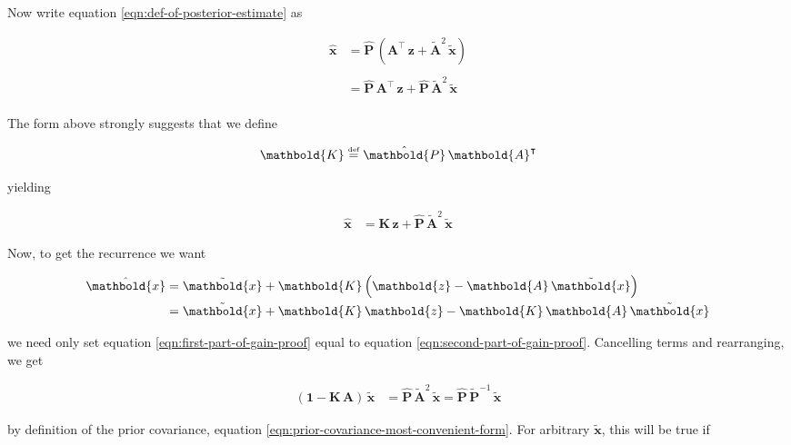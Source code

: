 \documentclass[10pt,oneside,x11names]{article}
\begin{document}
\noindent Now write 
equation
\ref{eqn:def-of-posterior-estimate}
as

\begin{align*}
\hat{\mathbold{x}}
&=
\hat{\mathbold{P}}\,
\left(
\mathbold{A}^\intercal\,
\mathbold{z} + 
{\tilde{\mathbold{A}}}^2\,
{\tilde{\mathbold{x}}}
\right)
\\
\\
&=
\hat{\mathbold{P}}\,\mathbold{A}^\intercal\,
\mathbold{z}
+
\hat{\mathbold{P}}\,
\tilde{\mathbold{A}}^2\,\tilde{\mathbold{x}}
\\
\end{align*}


The form above strongly suggests that we define

\begin{equation}
\label{eqn:kalman-gain-new-definition}
\mathbold{K}
\stackrel{\text{\tiny def}}{=}
{\hat{\mathbold{P}}}\,
\mathbold{A}^\intercal
\end{equation}

\noindent yielding

\begin{align}
\label{eqn:first-part-of-gain-proof}
\hat{\mathbold{x}}
&=
\mathbold{K}\,
\mathbold{z}
+
{\hat{\mathbold{P}}}\,
\tilde{\mathbold{A}}^2\,\tilde{\mathbold{x}}
\end{align}

\noindent Now, to get the recurrence we want

\begin{align}
\notag
\hat{\mathbold{x}}
&=
\tilde{\mathbold{x}}+
\mathbold{K}
\left(
\mathbold{z}-
\mathbold{A}\,
{\tilde{\mathbold{x}}}
\right)
\\
\label{eqn:second-part-of-gain-proof}
&=
\tilde{\mathbold{x}}+
\mathbold{K}\,
\mathbold{z}-
\mathbold{K}\,
\mathbold{A}\,
{\tilde{\mathbold{x}}}
\end{align}

\noindent we need only set equation \ref{eqn:first-part-of-gain-proof} equal to
equation \ref{eqn:second-part-of-gain-proof}.  Cancelling terms and rearranging,
we get

\begin{align}
\label{eqn:recurrence-to-prove}
(\mathbold{1}-\mathbold{K}\,\mathbold{A})\,
\tilde{\mathbold{x}}
&=
{\hat{\mathbold{P}}}\,
\tilde{\mathbold{A}}^2\,\tilde{\mathbold{x}} 
=
{\hat{\mathbold{P}}}\,
\tilde{\mathbold{P}}^{-1}\,\tilde{\mathbold{x}} 
\end{align}

\noindent by definition of the prior covariance, equation
\ref{eqn:prior-covariance-most-convenient-form}. For arbitrary
\(\tilde{\mathbold{x}}\), this will be true if 
\end{document}
